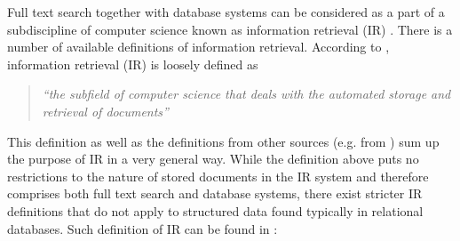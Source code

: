

















Full text search together with database systems can be considered  as a part of a subdiscipline of computer science known
as information retrieval (IR) \cite{Witten:1999:MGC:323905}.
There is a number of available definitions of information retrieval.
According to \cite{IRDataAlgorithms}, information
retrieval (IR) is loosely defined as

	\begin{quote}
		\textsl{``the subfield of computer science
	that deals with the automated storage and retrieval of documents''}
	\end{quote}

This definition as well as the definitions from other sources (e.g. from \cite{Witten:1999:MGC:323905}) sum up the purpose of IR in a very general way.
While the definition above puts no restrictions to the nature of stored documents in the IR system and therefore comprises both full text search and database systems, there exist stricter IR definitions that do not apply to structured data found typically in relational databases. 
Such definition of IR can be found in \cite{ManningRaghavanSchuetze08}:

